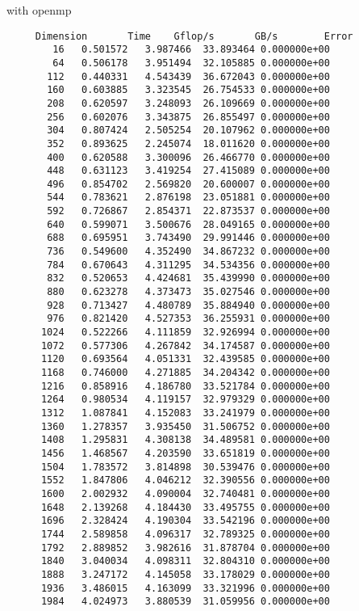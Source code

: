 \documentclass{article}
\begin{document}
with openmp
\begin{verbatim}
     Dimension       Time    Gflop/s       GB/s        Error
        16   0.501572   3.987466  33.893464 0.000000e+00
        64   0.506178   3.951494  32.105885 0.000000e+00
       112   0.440331   4.543439  36.672043 0.000000e+00
       160   0.603885   3.323545  26.754533 0.000000e+00
       208   0.620597   3.248093  26.109669 0.000000e+00
       256   0.602076   3.343875  26.855497 0.000000e+00
       304   0.807424   2.505254  20.107962 0.000000e+00
       352   0.893625   2.245074  18.011620 0.000000e+00
       400   0.620588   3.300096  26.466770 0.000000e+00
       448   0.631123   3.419254  27.415089 0.000000e+00
       496   0.854702   2.569820  20.600007 0.000000e+00
       544   0.783621   2.876198  23.051881 0.000000e+00
       592   0.726867   2.854371  22.873537 0.000000e+00
       640   0.599071   3.500676  28.049165 0.000000e+00
       688   0.695951   3.743490  29.991446 0.000000e+00
       736   0.549600   4.352490  34.867232 0.000000e+00
       784   0.670643   4.311295  34.534356 0.000000e+00
       832   0.520653   4.424681  35.439990 0.000000e+00
       880   0.623278   4.373473  35.027546 0.000000e+00
       928   0.713427   4.480789  35.884940 0.000000e+00
       976   0.821420   4.527353  36.255931 0.000000e+00
      1024   0.522266   4.111859  32.926994 0.000000e+00
      1072   0.577306   4.267842  34.174587 0.000000e+00
      1120   0.693564   4.051331  32.439585 0.000000e+00
      1168   0.746000   4.271885  34.204342 0.000000e+00
      1216   0.858916   4.186780  33.521784 0.000000e+00
      1264   0.980534   4.119157  32.979329 0.000000e+00
      1312   1.087841   4.152083  33.241979 0.000000e+00
      1360   1.278357   3.935450  31.506752 0.000000e+00
      1408   1.295831   4.308138  34.489581 0.000000e+00
      1456   1.468567   4.203590  33.651819 0.000000e+00
      1504   1.783572   3.814898  30.539476 0.000000e+00
      1552   1.847806   4.046212  32.390556 0.000000e+00
      1600   2.002932   4.090004  32.740481 0.000000e+00
      1648   2.139268   4.184430  33.495755 0.000000e+00
      1696   2.328424   4.190304  33.542196 0.000000e+00
      1744   2.589858   4.096317  32.789325 0.000000e+00
      1792   2.889852   3.982616  31.878704 0.000000e+00
      1840   3.040034   4.098311  32.804310 0.000000e+00
      1888   3.247172   4.145058  33.178029 0.000000e+00
      1936   3.486015   4.163099  33.321996 0.000000e+00
      1984   4.024973   3.880539  31.059956 0.000000e+00
\end{verbatim}
\end{document}
